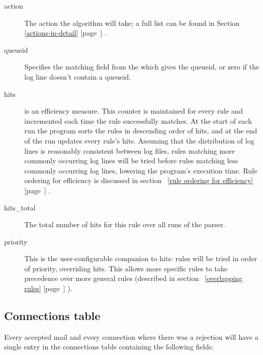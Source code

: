 \documentclass[a4paper,12pt,draft]{article}
\newcommand{\refwithpage}[1]{%
    \empty{}\ref{#1} [page~\pageref{#1}]%
}
\begin{document}
\begin{description}
    \item [action] The action the algorithm will take; a full list can be
        found in Section~\refwithpage{actions-in-detail}.

    \item [queueid] Specifies the matching field from the \regex{} which
        gives the queueid, or zero if the log line doesn't contain a
        queueid.

    \item [hits] is an efficiency measure.  This counter is maintained for
        every rule and incremented each time the rule successfully matches.
        At the start of each run the program sorts the rules in descending
        order of hits, and at the end of the run updates every rule's hits.
        Assuming that the distribution of log lines is reasonably
        consistent between log files, rules matching more commonly
        occurring log lines will be tried before rules matching less
        commonly occurring log lines, lowering the program's execution
        time.  Rule ordering for efficiency is discussed in
        section~\refwithpage{rule ordering for efficiency}.

    \item [hits\_total] The total number of hits for this rule over all
        runs of the parser.

    \item [priority] This is the user-configurable companion to hits: rules
        will be tried in order of priority, overriding hits.  This allows
        more specific rules to take precedence over more general rules
        (described in section~\refwithpage{overlapping rules}).

\end{description}


\subsection{Connections table}

\label{connections table}

Every accepted mail and every connection where there was a rejection will
have a single entry in the connections table containing the following
fields:
\end{document}
